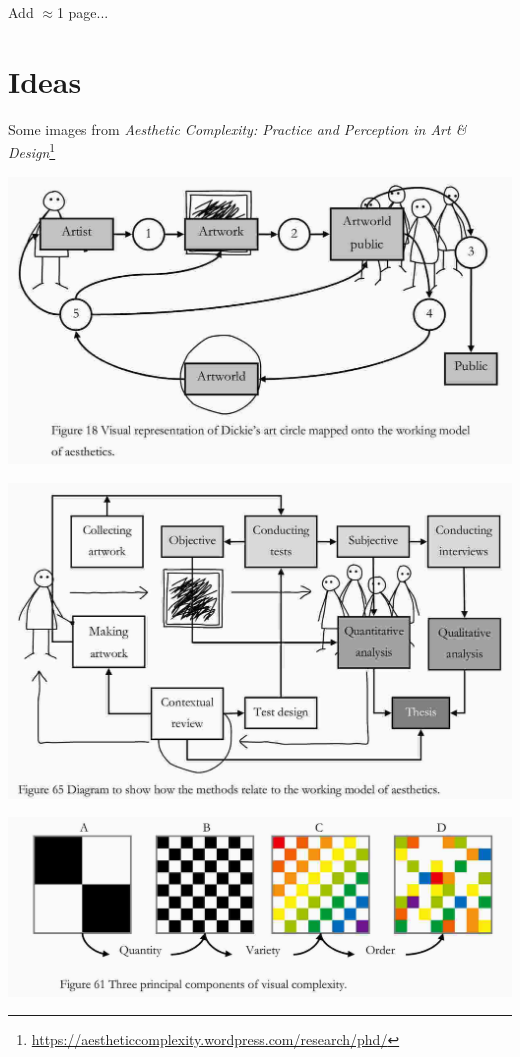 \documentclass[letter]{article}
\begin{document}
Add $\approx$1 page...

\section{Ideas}

Some images from \emph{Aesthetic Complexity: Practice and Perception in Art \& Design}\footnote{\url{https://aestheticcomplexity.wordpress.com/research/phd/}}

\includegraphics[width=\columnwidth]{./figures/artworld.jpg}

\includegraphics[width=\columnwidth]{./figures/aesthetic-research.jpg}

\includegraphics[width=\columnwidth]{./figures/quantity-variety-order.jpg}



\end{document}
